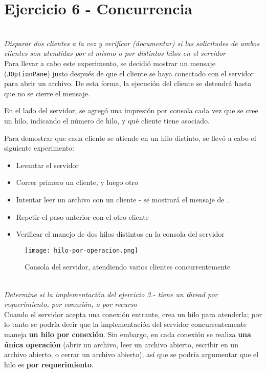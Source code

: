 \section{Ejercicio 6 - Concurrencia}

~\\
\emph{Disparar dos clientes a la vez y verificar (documentar) si las solicitudes de ambos clientes son atendidas por el mismo o por distintos hilos en el servidor} 
~\\

Para llevar a cabo este experimento, se decidió mostrar un mensaje (\texttt{JOptionPane}) justo después de que el cliente se haya conectado con el servidor para abrir un archivo. De esta forma, la ejecución del cliente se detendrá hasta que no se cierre el mensaje.

En el lado del servidor, se agregó una impresión por consola cada vez que se cree un hilo, indicando el número de hilo, y qué cliente tiene asociado.

Para demostrar que cada cliente se atiende en un hilo distinto, se llevó a cabo el siguiente experimento:

\begin{itemize}
    \item Levantar el servidor
    \item Correr primero un cliente, y luego otro
    \item Intentar leer un archivo con un cliente - se mostrará el mensaje de .
    \item Repetir el paso anterior con el otro cliente
    \item Verificar el manejo de dos hilos distintos en la consola del servidor
\end{itemize}

\begin{figure}[H]
    \centering
    \texttt{[image: hilo-por-operacion.png]}
    \caption{Consola del servidor, atendiendo varios clientes concurrentemente}
\end{figure}

~\\
\emph{Determine si la implementación del ejercicio 3.- tiene un thread por requerimiento, por conexión, o por recurso} 
~\\

Cuando el servidor acepta una conexión entrante, crea un hilo para atenderla; por lo tanto se podría decir que la implementación del servidor concurrentemente maneja \textbf{un hilo por conexión}. Sin embargo, en cada conexión se realiza \textbf{una única operación} (abrir un archivo, leer un archivo abierto, escribir en un archivo abierto, o cerrar un archivo abierto), así que se podría argumentar que el hilo es \textbf{por requerimiento}. 

